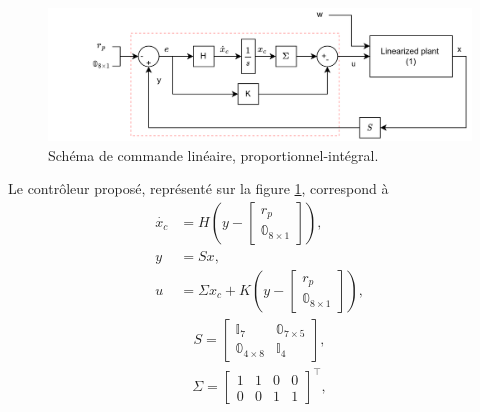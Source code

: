 \begin{figure}[ht!]
    \centering
    \includegraphics[trim=5cm 0cm 0cm 0cm,clip,width=1\columnwidth]{figures/commande_integrale_ACA-min.png}
    \caption{Schéma de commande linéaire, proportionnel-intégral.}
    \label{fig:commande_int3DOF}
\end{figure}
Le contrôleur proposé, représenté sur la figure \ref{fig:commande_int3DOF}, correspond à
    \begin{align}
        \dot{x_{c}} &= H(y-\begin{bmatrix}r_{p}\\\mathbb{0}_{8\times 1} \end{bmatrix}),\\
        y &= S x,\\
        u &= \Sigma x_{c} + K(y-\begin{bmatrix}r_{p}\\\mathbb{0}_{8\times 1} \end{bmatrix}),
    \end{align}
    \begin{align}
        S =\begin{bmatrix} \mathbb{I}_{7} &  \mathbb{0}_{7\times 5} \\
         \mathbb{0}_{4\times 8} &  \mathbb{I}_{4}
          \end{bmatrix}, 
    \end{align}
    \begin{align}
        \Sigma = \begin{bmatrix} 1 & 1 & 0 & 0\\ 0 & 0 & 1 & 1\end{bmatrix}^\top,
    \end{align}


